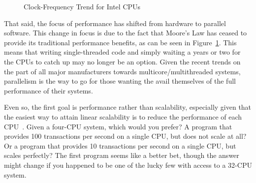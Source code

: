 \begin{figure}[tb]
\begin{center}
\end{center}
\caption{Clock-Frequency Trend for Intel CPUs}
\label{fig:intro:Clock-Frequency Trend for Intel CPUs}
\end{figure}

That said, the focus of performance has shifted from hardware to
parallel software.
This change in focus is due to the fact that Moore's Law has ceased to
provide its traditional performance
benefits, as can be seen in
Figure~\ref{fig:intro:Clock-Frequency Trend for Intel CPUs}.
This means that writing single-threaded code and simply waiting
a years or two for the CPUs to catch up may no longer be an option.
Given the recent trends on the part of all major manufacturers towards
multicore/multithreaded systems, parallelism is the way to go for
those wanting the avail themselves of the full performance of their
systems.

Even so, the first goal is performance rather than scalability,
especially given that the easiest way to attain linear scalability
is to reduce the performance of each CPU~\cite{LinusTorvalds2001a}.
Given a four-CPU system, which would you prefer?
A program that provides 100 transactions per second on a single CPU,
but does not scale at all?
Or a program that provides 10 transactions per second on a single CPU,
but scales perfectly?
The first program seems like a better bet, though the answer might
change if you happened to be one of the lucky few with access to a
32-CPU system.

